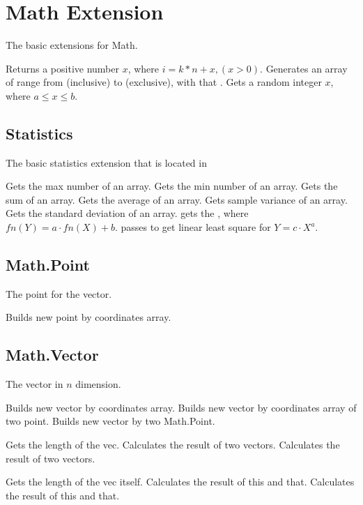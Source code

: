 \section{Math Extension}
The basic extensions for Math.

Returns a positive number $x$, where $i = k * n + x, (x > 0)$.
Generates an array of range from  (inclusive) to  (exclusive), with that .
Gets a random integer $x$, where $ a \leq x \leq b $.
 
\subsection{Statistics}
The basic statistics extension that is located in 

Gets the max number of an array.
Gets the min number of an array.
Gets the sum of an array.
Gets the average of an array.
Gets sample variance of an array.
Gets the standard deviation of an array.
gets the \cd{[a, b]}, where $fn(Y) = a \cdot fn(X) + b$. passes  to get linear least square for $Y = c \cdot X^a$.


\subsection{Math.Point}
The point for the vector.

Builds new point by coordinates array.

\subsection{Math.Vector}
The vector in $n$ dimension.

Builds new vector by coordinates array.
Builds new vector by coordinates array of two point.
Builds new vector by two Math.Point.

Gets the length of the vec.
Calculates the  result of two vectors.
Calculates the  result of two vectors.

Gets the length of the vec itself.
Calculates the  result of this and that.
Calculates the  result of this and that.